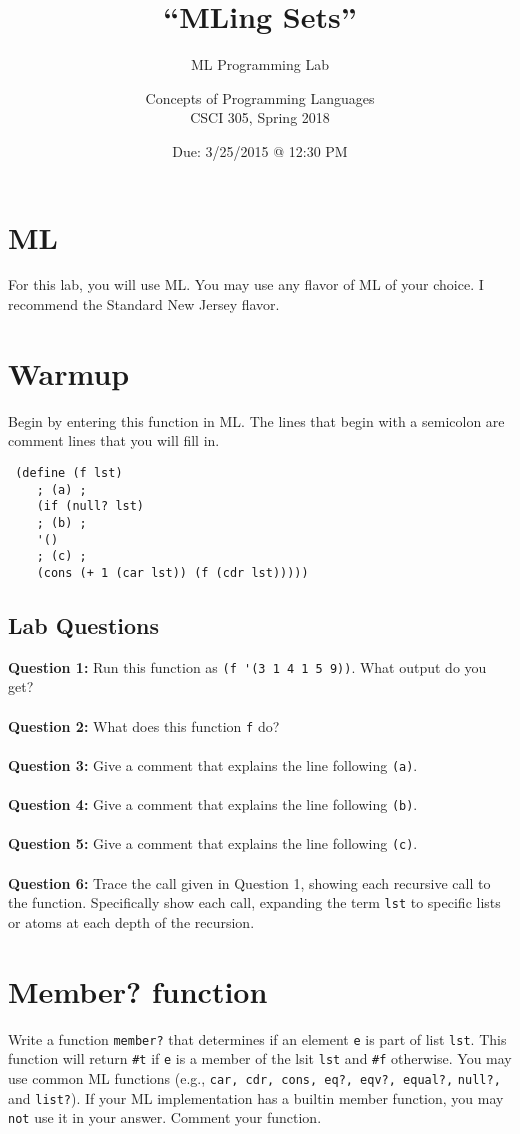 \documentclass{article}
\title{``MLing Sets''}
\subtitle{ML Programming Lab}
\author{Concepts of Programming Languages\\CSCI 305, Spring 2018}
\date{Due: 3/25/2015 @ 12:30 PM}
\begin{document}
\maketitle

\section*{ML}
For this lab, you will use ML. You may use any flavor of ML of your choice. I recommend the Standard New Jersey flavor.

\section*{Warmup}
Begin by entering this function in ML. The lines that begin with a semicolon are comment lines that you will fill in.

\begin{lstlisting}
 (define (f lst)
    ; (a) ;
    (if (null? lst)
	; (b) ;
	'()
	; (c) ;
	(cons (+ 1 (car lst)) (f (cdr lst)))))
\end{lstlisting}


\begin{tcolorbox}
 \section*{Lab Questions}
 \textbf{Question 1:} Run this function as \verb|(f '(3 1 4 1 5 9))|. What output do you get?
 \\\\
 \textbf{Question 2:} What does this function \verb|f| do?
 \\\\
 \textbf{Question 3:} Give a comment that explains the line following \verb|(a)|.
 \\\\
 \textbf{Question 4:} Give a comment that explains the line following \verb|(b)|.
 \\\\
 \textbf{Question 5:} Give a comment that explains the line following \verb|(c)|.
 \\\\
 \textbf{Question 6:} Trace the call given in Question 1, showing each recursive call to the function. Specifically show each call, expanding the term \verb|lst| to specific lists or atoms at each depth of the recursion.
\end{tcolorbox}

\section*{Member? function}
Write a function \verb|member?| that determines if an element \verb|e| is part of list \verb|lst|. This function will return \verb|#t| if \verb|e| is a member of the lsit \verb|lst| and \verb|#f| otherwise. You may use common ML functions (e.g., \verb|car, cdr, cons, eq?, eqv?, equal?,| \verb|null?,| and \verb|list?|). If your ML implementation has a builtin member function, you may \verb|not| use it in your answer. Comment your function.
\end{document}
